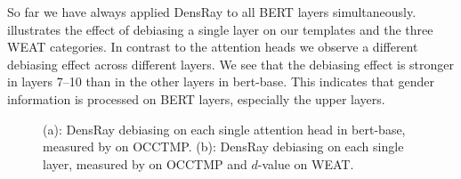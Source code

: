 So far we have always applied DensRay to all BERT layers
simultaneously.   illustrates the effect of
debiasing a single  layer on our templates and the three
WEAT categories.  In contrast to the attention heads we observe a different debiasing effect across different layers. We see that the debiasing effect is
stronger in layers 7--10 than in the other layers in
bert-base. This indicates that gender information is processed on BERT layers, especially the upper layers.
\begin{figure}[h]
	\centering
	\footnotesize
	\vspace{0cm}  
	\setlength{\abovecaptionskip}{0.1cm}   
	\setlength{\belowcaptionskip}{0cm}
	\centering
	\caption{(a): DensRay debiasing on each single attention head in bert-base, measured by  on OCCTMP. (b): DensRay debiasing on each single layer, measured by  on  OCCTMP and $d$-value on WEAT.}
\end{figure}

